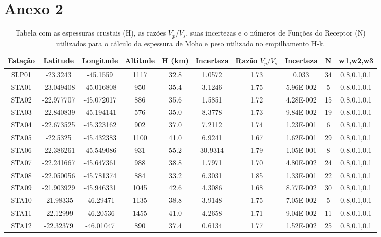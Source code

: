 \chapter*{Anexo 2}
\begin{table}[!ht]
\begin{center}
\small
\caption{Tabela com as espessuras crustais (H), as razões $V_{p}/V_{s}$, suas incertezas e o números de Funções do Receptor (N) utilizados para o cálculo da espessura de Moho e peso utilizado no empilhamento H-k.}
\begin{tabular}{| c | c | c | c | c | c | c | c | c | c |}
\hline
{\textbf{Estação}} & {\textbf{Latitude}} & {\textbf{Longitude}} & {\textbf{Altitude}} & {\textbf{H (km)}} & {\textbf{Incerteza}} & {\textbf{Razão $V_{p}/V_{s}$}} & {\textbf{Incerteza}} & {\textbf{N}} & {\textbf{w1,w2,w3}}\\
\hline 
SLP01 & -23.3243 & -45.1559 & 1117 & 32.8 & 1.0572 & 1.73 & 0.033 & 34 & 0.8,0.1,0.1\\
STA01 & -23.049408 & -45.016808 & 950 & 35.4 & 3.1246 & 1.75 & 5.96E-002 & 5 & 0.8,0.1,0.1\\
STA02 & -22.977707 & -45.072017 & 886 & 35.6 & 1.5851 & 1.72 & 4.28E-002 & 15 & 0.8,0.1,0.1\\
STA03 & -22.840839 & -45.194141 & 576 & 35.0 & 8.3778 & 1.73 & 9.84E-002 & 19 & 0.8,0.1,0.1\\
STA04 & -22.673525 & -45.323162 & 902 & 37.0 & 7.2112 & 1.74 & 1.23E-001 & 6 & 0.8,0.1,0.1\\
STA05 & -22.5325 & -45.432383 & 1100 & 41.0 & 6.9241 & 1.67 & 1.62E-001 & 29 & 0.8,0.1,0.1\\
STA06 & -22.386261 & -45.549086 & 931 & 55.2 & 30.9314 & 1.79 & 1.05E-001 & 8 & 0.8,0.1,0.1\\
STA07 & -22.241667 & -45.647361 & 988 & 38.8 & 1.7971 & 1.70 & 4.80E-002 & 24 & 0.8,0.1,0.1\\
STA08 & -22.050056 & -45.781374 & 884 & 33.2 & 6.3031 & 1.85 & 1.33E-001 & 22 & 0.8,0.1,0.1\\
STA09 & -21.903929 & -45.946331 & 1045 & 42.6 & 4.3086 & 1.68 & 8.77E-002 & 30 & 0.8,0.1,0.1\\
STA10 & -21.98335 & -46.29471 & 1135 & 38.8 & 3.9148 & 1.75 & 7.05E-002 & 5 & 0.8,0.1,0.1\\
STA11 & -22.12999 & -46.20536 & 1455 & 41.0 & 4.2658 & 1.71 & 9.04E-002 & 11 & 0.8,0.1,0.1\\
STA12 & -22.32379 & -46.01047 & 890 & 37.4 & 0.6134 & 1.77 & 1.52E-002 & 25 & 0.8,0.1,0.1\\

\end{tabular}
\end{center}
\end{table}
